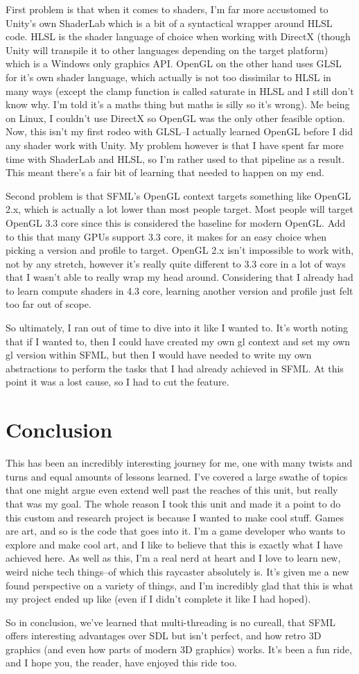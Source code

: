 \documentclass{article}
\begin{document}
First problem is that when it comes to shaders, I'm far more accustomed to
Unity's own ShaderLab which is a bit of a syntactical wrapper around HLSL code.
HLSL is the shader language of choice when working with DirectX (though Unity
will transpile it to other languages depending on the target platform) which is
a Windows only graphics API. OpenGL on the other hand uses GLSL for it's own
shader language, which actually is not too dissimilar to HLSL in many ways
(except the clamp function is called saturate in HLSL and I still don't know
why. I'm told it's a maths thing but maths is silly so it's wrong). Me being on
Linux, I couldn't use DirectX so OpenGL was the only other feasible option. Now,
this isn't my first rodeo with GLSL--I actually learned OpenGL before I did any
shader work with Unity. My problem however is that I have spent far more time
with ShaderLab and HLSL, so I'm rather used to that pipeline as a result. This
meant there's a fair bit of learning that needed to happen on my end.

Second problem is that SFML's OpenGL context targets something like OpenGL 2.x,
which is actually a lot lower than most people target. Most people will target
OpenGL 3.3 core since this is considered the baseline for modern OpenGL. Add to
this that many GPUs support 3.3 core, it makes for an easy choice when picking
a version and profile to target. OpenGL 2.x isn't impossible to work with, not
by any stretch, however it's really quite different to 3.3 core in a lot of ways
that I wasn't able to really wrap my head around. Considering that I already had
to learn compute shaders in 4.3 core, learning another version and profile just
felt too far out of scope.

So ultimately, I ran out of time to dive into it like I wanted to. It's worth
noting that if I wanted to, then I could have created my own gl context and set
my own gl version within SFML, but then I would have needed to write my own
abstractions to perform the tasks that I had already achieved in SFML. At this
point it was a lost cause, so I had to cut the feature.

\section{Conclusion}
This has been an incredibly interesting journey for me, one with many twists and
turns and equal amounts of lessons learned. I've covered a large swathe of
topics that one might argue even extend well past the reaches of this unit, but
really that was my goal. The whole reason I took this unit and made it a point
to do this custom and research project is because I wanted to make cool stuff.
Games are art, and so is the code that goes into it. I'm a game developer who
wants to explore and make cool art, and I like to believe that this is exactly
what I have achieved here. As well as this, I'm a real nerd at heart and I love
to learn new, weird niche tech things--of which this raycaster absolutely is.
It's given me a new found perspective on a variety of things, and I'm incredibly
glad that this is what my project ended up like (even if I didn't complete it
like I had hoped).

So in conclusion, we've learned that multi-threading is no cureall, that SFML
offers interesting advantages over SDL but isn't perfect, and how retro 3D
graphics (and even how parts of modern 3D graphics) works. It's been a fun ride,
and I hope you, the reader, have enjoyed this ride too.
\end{document}
